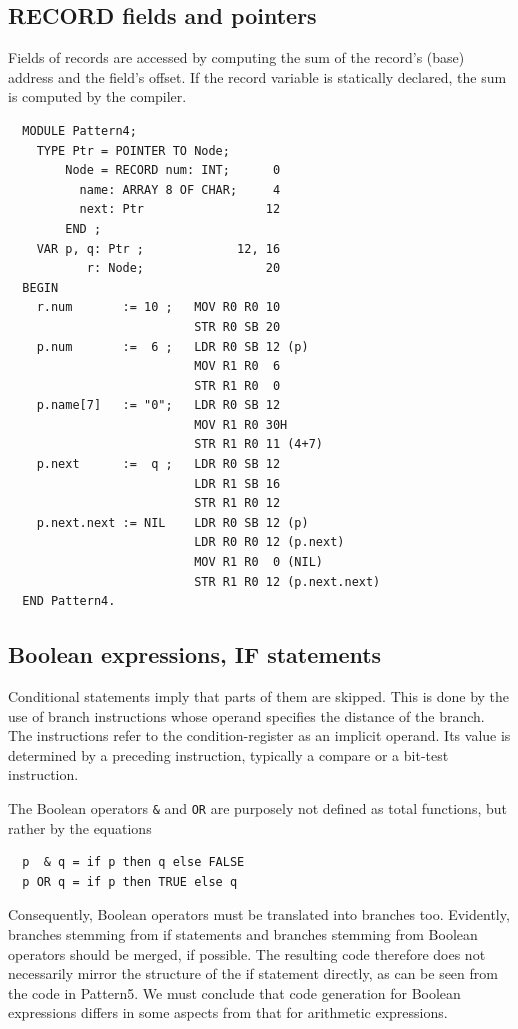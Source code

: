 \subsection{RECORD fields and pointers}
\label{ssc:ptn4}
Fields of records are accessed by computing the sum of the record's (base) address and the field's
offset. If the record variable is statically declared, the sum is computed by the compiler.
\begin{verbatim}
  MODULE Pattern4;
    TYPE Ptr = POINTER TO Node;
        Node = RECORD num: INT;      0      
          name: ARRAY 8 OF CHAR;     4
          next: Ptr                 12
        END ;                       
    VAR p, q: Ptr ;             12, 16
           r: Node;                 20
  BEGIN
    r.num       := 10 ;   MOV R0 R0 10               
                          STR R0 SB 20
    p.num       :=  6 ;   LDR R0 SB 12 (p)
                          MOV R1 R0  6
                          STR R1 R0  0
    p.name[7]   := "0";   LDR R0 SB 12
                          MOV R1 R0 30H
                          STR R1 R0 11 (4+7)
    p.next      :=  q ;   LDR R0 SB 12
                          LDR R1 SB 16
                          STR R1 R0 12
    p.next.next := NIL    LDR R0 SB 12 (p)
                          LDR R0 R0 12 (p.next)
                          MOV R1 R0  0 (NIL)
                          STR R1 R0 12 (p.next.next)
  END Pattern4.
\end{verbatim}

\subsection{Boolean expressions, IF statements}
\label{ssc:ptn5}
Conditional statements imply that parts of them are skipped. This is done by the use of branch
instructions whose operand specifies the distance of the branch. The instructions refer to the
condition-register as an implicit operand. Its value is determined by a preceding instruction,
typically a compare or a bit-test instruction.

The Boolean operators \verb|&| and \verb|OR| are purposely not defined as total functions, but
rather by the equations
\begin{verbatim}
  p  & q = if p then q else FALSE
  p OR q = if p then TRUE else q
\end{verbatim}

Consequently, Boolean operators must be translated into branches too. Evidently, branches
stemming from if statements and branches stemming from Boolean operators should be merged, if
possible. The resulting code therefore does not necessarily mirror the structure of the if statement
directly, as can be seen from the code in Pattern5. We must conclude that code generation for
Boolean expressions differs in some aspects from that for arithmetic expressions.

